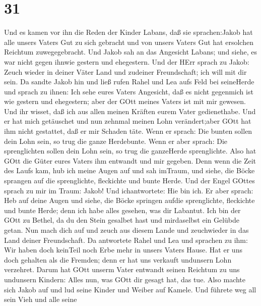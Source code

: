 \hypertarget{section-30}{%
\section{31}\label{section-30}}

 Und es kamen vor ihn die Reden der Kinder Labans, daß sie
sprachen:Jakob hat alle unsers Vaters Gut zu sich gebracht und von
unsers Vaters Gut hat ersolchen Reichtum zuwegegebracht. 
Und Jakob sah an das Angesicht Labans; und siehe, es war nicht gegen
ihnwie gestern und ehegestern.  Und der HErr sprach zu
Jakob: Zeuch wieder in deiner Väter Land und zudeiner Freundschaft; ich
will mit dir sein.  Da sandte Jakob hin und ließ rufen Rahel
und Lea aufs Feld bei seineHerde  und sprach zu ihnen: Ich
sehe eures Vaters Angesicht, daß es nicht gegenmich ist wie gestern und
ehegestern; aber der GOtt meines Vaters ist mit mir gewesen.
 Und ihr wisset, daß ich aus allen meinen Kräften eurem
Vater gedienethabe.  Und er hat mich getäuschet und nun
zehnmal meinen Lohn verändert;aber GOtt hat ihm nicht gestattet, daß er
mir Schaden täte.  Wenn er sprach: Die bunten sollen dein
Lohn sein, so trug die ganze Herdebunte. Wenn er aber sprach: Die
sprenglichten sollen dein Lohn sein, so trug die ganzeHerde
sprenglichte.  Also hat GOtt die Güter eures Vaters ihm
entwandt und mir gegeben.  Denn wenn die Zeit des Laufs
kam, hub ich meine Augen auf und sah imTraum, und siehe, die Böcke
sprangen auf die sprenglichte, fleckichte und bunte Herde. 
Und der Engel GOttes sprach zu mir im Traum: Jakob! Und ichantwortete:
Hie bin ich.  Er aber sprach: Heb auf deine Augen und
siehe, die Böcke springen aufdie sprenglichte, fleckichte und bunte
Herde; denn ich habe alles gesehen, was dir Labantut.  Ich
bin der GOtt zu Bethel, da du den Stein gesalbet hast und mirdaselbst
ein Gelübde getan. Nun mach dich auf und zeuch aus diesem Lande und
zeuchwieder in das Land deiner Freundschaft.  Da antwortete
Rahel und Lea und sprachen zu ihm: Wir haben doch keinTeil noch Erbe
mehr in unsers Vaters Hause.  Hat er uns doch gehalten als
die Fremden; denn er hat uns verkauft undunsern Lohn verzehret.
 Darum hat GOtt unserm Vater entwandt seinen Reichtum zu
uns undunsern Kindern: Alles nun, was GOtt dir gesagt hat, das tue.
 Also machte sich Jakob auf und lud seine Kinder und Weiber
auf Kamele.  Und führete weg all sein Vieh und alle seine
